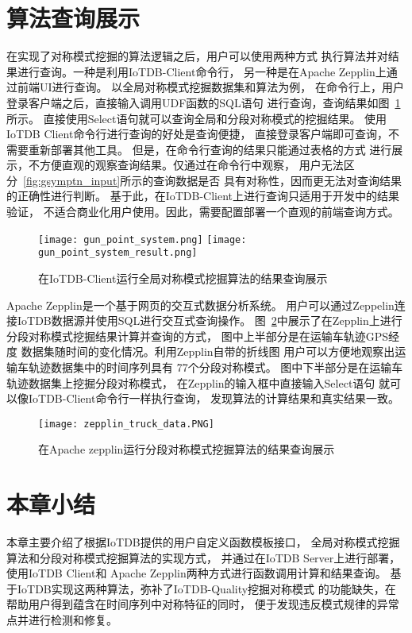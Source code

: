 \section{算法查询展示}

在实现了对称模式挖掘的算法逻辑之后，用户可以使用两种方式
执行算法并对结果进行查询。一种是利用IoTDB-Client命令行，
另一种是在Apache Zepplin上通过前端UI进行查询。
以全局对称模式挖掘数据集和算法为例，
在命令行上，用户登录客户端之后，直接输入调用UDF函数的SQL语句
进行查询，查询结果如图~\ref{fig:iotdb_client_symptn}所示。
直接使用Select语句就可以查询全局和分段对称模式的挖掘结果。
使用IoTDB Client命令行进行查询的好处是查询便捷，
直接登录客户端即可查询，不需要重新部署其他工具。
但是，在命令行查询的结果只能通过表格的方式
进行展示，不方便直观的观察查询结果。仅通过在命令行中观察，
用户无法区分~\ref{fig:gsymptn_input}所示的查询数据是否
具有对称性，因而更无法对查询结果的正确性进行判断。
基于此，在IoTDB-Client上进行查询只适用于开发中的结果验证，
不适合商业化用户使用。因此，需要配置部署一个直观的前端查询方式。
\begin{figure}
    \centering
    {\texttt{[image: gun\_point\_system.png]}}
    {\texttt{[image: gun\_point\_system\_result.png]}}
    \caption{在IoTDB-Client运行全局对称模式挖掘算法的结果查询展示}
    \label{fig:iotdb_client_symptn}
\end{figure}

Apache Zepplin是一个基于网页的交互式数据分析系统。
用户可以通过Zeppelin连接IoTDB数据源并使用SQL进行交互式查询操作。
图~\ref{fig:iotdb_zepplin_symptn}中展示了在Zepplin上进行
分段对称模式挖掘结果计算并查询的方式，
图中上半部分是在运输车轨迹GPS经度
数据集随时间的变化情况。利用Zepplin自带的折线图
用户可以方便地观察出运输车轨迹数据集中的时间序列具有
77个分段对称模式。
图中下半部分是在运输车轨迹数据集上挖掘分段对称模式，
在Zepplin的输入框中直接输入Select语句
就可以像IoTDB-Client命令行一样执行查询，
发现算法的计算结果和真实结果一致。
\begin{figure}
    \centering
    \texttt{[image: zepplin\_truck\_data.PNG]}
    \caption{在Apache zepplin运行分段对称模式挖掘算法的结果查询展示}
    \label{fig:iotdb_zepplin_symptn}
\end{figure}


\section{本章小结}
本章主要介绍了根据IoTDB提供的用户自定义函数模板接口，
全局对称模式挖掘算法和分段对称模式挖掘算法的实现方式，
并通过在IoTDB Server上进行部署，使用IoTDB Client和
Apache Zepplin两种方式进行函数调用计算和结果查询。
基于IoTDB实现这两种算法，弥补了IoTDB-Quality挖掘对称模式
的功能缺失，在帮助用户得到蕴含在时间序列中对称特征的同时，
便于发现违反模式规律的异常点并进行检测和修复。